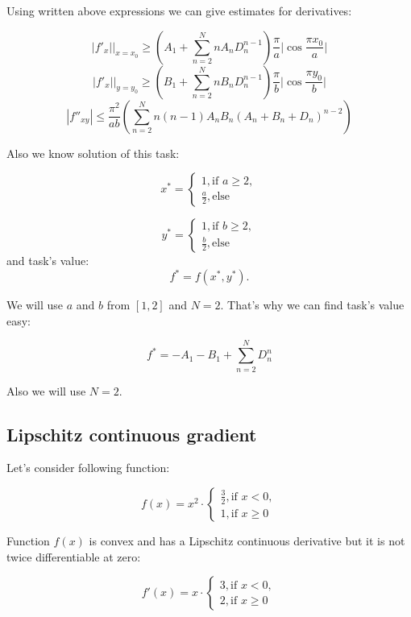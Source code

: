 \documentclass[12pt]{article}
\begin{document}
Using written above expressions we can give estimates for derivatives:

$$|f'_x|\Big|_{x = x_0} \geq \left(A_1 + \sum\limits_{n=2}^N n A_n D_n^{n-1}\right)\frac{\pi}{a}\Big|\cos \frac{\pi x_0}{a}\Big|$$
$$|f'_x|\Big|_{y = y_0} \geq \left(B_1 + \sum\limits_{n=2}^N n B_n D_n^{n-1}\right)\frac{\pi}{b}\Big|\cos \frac{\pi y_0}{b}\Big|$$
$$|f''_{xy}| \leq \frac{\pi^2}{ab}\left(\sum\limits_{n=2}^Nn(n-1)A_nB_n\left(A_n + B_n + D_n\right)^{n-2}\right)$$

Also we know solution of this task:

\begin{equation}
x^* = \begin{cases}
1, \text{if $a \geq 2$},\\
\frac{a}{2}, \text{else}
\end{cases}
\end{equation}

\begin{equation}
y^* = \begin{cases}
1, \text{if $b \geq 2$},\\
\frac{b}{2}, \text{else}
\end{cases}
\end{equation}
and task's value:
$$f^* = f(x^*, y^*).$$

We will use $a$ and $b$ from $[1, 2]$ and $N = 2$. That's why we can find task's value easy:

$$f^* = -A_1 - B_1 + \sum\limits_{n=2}^ND_n^n$$

Also we will use $N = 2$.

\subsection{Lipschitz continuous gradient}

Let's consider following function:

\begin{equation}
f(x) = x^2\cdot\begin{cases}
\frac{3}{2}, \text{if $x < 0$},\\
1, \text{if $x \geq 0$}
\end{cases}
\end{equation}

Function $f(x)$ is convex and has a Lipschitz continuous derivative but it is not twice differentiable at zero:

\begin{equation}
f'(x) = x\cdot\begin{cases}
3, \text{if $x < 0$},\\
2, \text{if $x \geq 0$}
\end{cases}
\end{equation}
\end{document}
